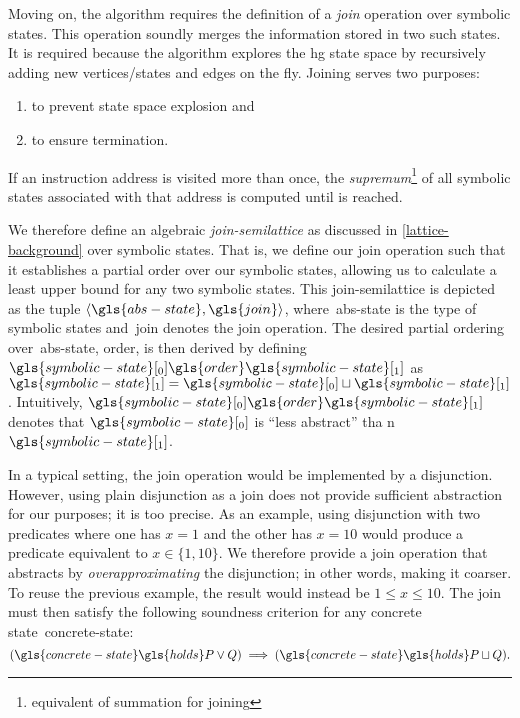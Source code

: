 Moving on, the algorithm requires the definition of a \emph{join} operation over symbolic states.
This operation soundly merges the information stored in two such states.
It is required because the algorithm explores the \ac{hg} state space by recursively adding new vertices/states and edges on the fly.
Joining serves two purposes:
\begin{enumerate}
  \item to prevent state space explosion and
  \item to ensure termination.
\end{enumerate}
If an instruction address is visited more than once,
the \emph{supremum}\footnote{equivalent of summation for joining}
of all symbolic states associated with that address
is computed until  is reached.

We therefore define an algebraic \emph{join-semilattice} as discussed in \cref{lattice-background} over symbolic states.
That is, we define our join operation
such that it establishes a partial order over our symbolic states,
allowing us to calculate a least upper bound for any two symbolic states.
This join-semilattice is depicted as the tuple $\langle\gls{abs-state},\gls{join}\rangle$,
where~\gls{abs-state} is the type of symbolic states
and~\gls{join} denotes the join operation.
The desired partial ordering over~\gls{abs-state}, \gls{order}, is then derived
by defining $\gls{symbolic-state}[_0] \gls{order} \gls{symbolic-state}[_1]$ as $\gls{symbolic-state}[_1] = \gls{symbolic-state}[_0] \sqcup \gls{symbolic-state}[_1]$.
Intuitively, $\gls{symbolic-state}[_0] \gls{order} \gls{symbolic-state}[_1]$ denotes that $\gls{symbolic-state}[_0]$ is ``less abstract'' tha	n $\gls{symbolic-state}[_1]$.

In a typical setting, the join operation would be implemented by a disjunction.
However, using plain disjunction as a join does not provide sufficient abstraction for our purposes; it is too precise.
As an example, using disjunction with two predicates where one has $x=1$ and the other has $x=10$ would produce a predicate equivalent to $x\in\{1,10\}$.
We therefore provide a join operation that abstracts
by \emph{overapproximating} the disjunction; in other words, making it coarser.
To reuse the previous example, the result would instead be $1\leq x\leq 10$.
The join must then satisfy the following soundness criterion
for any concrete state~\gls{concrete-state}:
\begin{equation}
  (\gls{concrete-state}\gls{holds}P \lor Q) \implies (\gls{concrete-state}\gls{holds}P\sqcup Q).
\end{equation}

